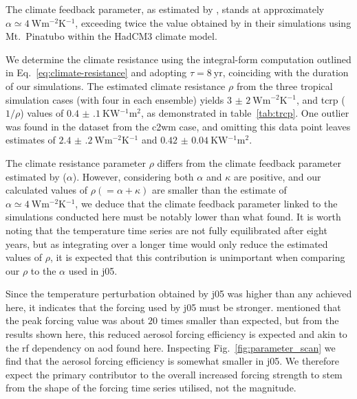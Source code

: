 \documentclass{ametsocV6.1}
\begin{document}
The climate feedback parameter, as estimated by \citet{jones2005}, stands at
approximately \(\alpha \simeq \SI{4}{\watt\metre^{-2}\kelvin^{-1}}\), exceeding twice
the value obtained by \citet{gregory2016} in their simulations using Mt.\ Pinatubo
within the HadCM3 climate model.

We determine the climate resistance using the integral-form computation outlined in
Eq.~\ref{eq:climate-resistance} and adopting \(\tau =\SI{8}{\mathrm{yr}}\), coinciding
with the duration of our simulations. The estimated climate resistance \(\rho \) from
the three tropical simulation cases (with four in each ensemble) yields
\(\SI{3(2)}{\watt\metre^{-2}\kelvin^{-1}}\), and \gls{tcrp} (\(1/\rho\)) values of
\(\SI{0.4(1)}{\kelvin\watt^{-1}\metre^{2}}\), as demonstrated in table~\ref{tab:trcp}.
One outlier was found in the dataset from the \gls{c2wm} case, and omitting this data
point leaves estimates of \(\SI{2.4(2)}{\watt\metre^{-2}\kelvin^{-1}}\) and
\(\SI{0.42(4)}{\kelvin\watt^{-1}\metre^{2}}\).

The climate resistance parameter \(\rho\) differs from the climate feedback parameter
estimated by \citet{jones2005} (\(\alpha\)). However, considering both \(\alpha\) and
\(\kappa\) are positive, and our calculated values of \(\rho(=\alpha+\kappa)\) are
smaller than the \citet{jones2005} estimate of \(\alpha \simeq
\SI{4}{\watt\metre^{-2}\kelvin^{-1}}\), we deduce that the climate feedback parameter
linked to the simulations conducted here must be notably lower than what
\citet{jones2005} found. It is worth noting that the temperature time series are not
fully equilibrated after eight years, but as integrating over a longer time would only
reduce the estimated values of \(\rho\), it is expected that this contribution is
unimportant when comparing our \(\rho\) to the \(\alpha\) used in \gls{j05}.

Since the temperature perturbation obtained by \gls{j05} was higher than any achieved
here, it indicates that the forcing used by \gls{j05} must be stronger.
\citet{gregory2016} mentioned that the peak forcing value was about \(20\) times smaller
than expected, but from the results shown here, this reduced aerosol forcing efficiency
is expected and akin to the \gls{rf} dependency on \gls{aod} found here. Inspecting
Fig.~\ref{fig:parameter_scan} we find that the aerosol forcing efficiency is somewhat
smaller in \gls{j05}. We therefore expect the primary contributor to the overall
increased forcing strength to stem from the shape of the forcing time series utilised,
not the magnitude.
\end{document}
